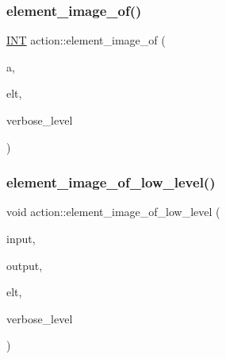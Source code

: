 \mbox{\label{classaction_ae09559d4537a048fc860f8a74a31393d}} 
\subsubsection{\texorpdfstring{element\+\_\+image\+\_\+of()}{element\_image\_of()}}
{\footnotesize\ttfamily \mbox{\hyperlink{galois_8h_a09fddde158a3a20bd2dcadb609de11dc}{I\+NT}} action\+::element\+\_\+image\+\_\+of (\begin{DoxyParamCaption}\item[{\mbox{\hyperlink{galois_8h_a09fddde158a3a20bd2dcadb609de11dc}{I\+NT}}}]{a,  }\item[{void $\ast$}]{elt,  }\item[{\mbox{\hyperlink{galois_8h_a09fddde158a3a20bd2dcadb609de11dc}{I\+NT}}}]{verbose\+\_\+level }\end{DoxyParamCaption})}

\mbox{\label{classaction_a45f6affc163c5034d1211f3cfa6db3a0}} 
\subsubsection{\texorpdfstring{element\+\_\+image\+\_\+of\+\_\+low\+\_\+level()}{element\_image\_of\_low\_level()}}
{\footnotesize\ttfamily void action\+::element\+\_\+image\+\_\+of\+\_\+low\+\_\+level (\begin{DoxyParamCaption}\item[{\mbox{\hyperlink{galois_8h_a09fddde158a3a20bd2dcadb609de11dc}{I\+NT}} $\ast$}]{input,  }\item[{\mbox{\hyperlink{galois_8h_a09fddde158a3a20bd2dcadb609de11dc}{I\+NT}} $\ast$}]{output,  }\item[{void $\ast$}]{elt,  }\item[{\mbox{\hyperlink{galois_8h_a09fddde158a3a20bd2dcadb609de11dc}{I\+NT}}}]{verbose\+\_\+level }\end{DoxyParamCaption})}

\mbox{\label{classaction_aa4bd01e338497714586636751fcef436}} 
